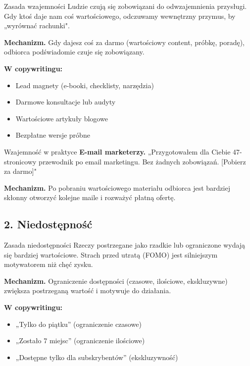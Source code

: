 \documentclass[
  12pt,
  a4paper,
  twoside,
  openright,
  12pt,
  DIV=12,
  BCOR=12mm]{scrbook}
\providecommand{\tightlist}{%
  \setlength{\itemsep}{0pt}\setlength{\parskip}{0pt}}\usepackage{longtable,booktabs,array}
\begin{document}
\begin{pojecie}{Zasada wzajemności}
Ludzie czują się zobowiązani do odwzajemnienia przysługi. Gdy ktoś daje nam coś wartościowego, odczuwamy wewnętrzny przymus, by „wyrównać rachunki".
\end{pojecie}

\textbf{Mechanizm.} Gdy dajesz coś za darmo (wartościowy content,
próbkę, poradę), odbiorca podświadomie czuje się zobowiązany.

\textbf{W copywritingu:}

\begin{itemize}
\tightlist
\item
  Lead magnety (e-booki, checklisty, narzędzia)
\item
  Darmowe konsultacje lub audyty
\item
  Wartościowe artykuły blogowe
\item
  Bezpłatne wersje próbne
\end{itemize}

\begin{przyklad}{Wzajemność w praktyce}
\textbf{E-mail marketerzy.} „Przygotowałem dla Ciebie 47-stronicowy przewodnik po email marketingu. Bez żadnych zobowiązań. [Pobierz za darmo]"

\textbf{Mechanizm.} Po pobraniu wartościowego materiału odbiorca jest bardziej skłonny otworzyć kolejne maile i rozważyć płatną ofertę.
\end{przyklad}

\subsection{2. Niedostępność}\label{niedostux119pnoux15bux107}

\begin{pojecie}{Zasada niedostępności}
Rzeczy postrzegane jako rzadkie lub ograniczone wydają się bardziej wartościowe. Strach przed utratą (FOMO) jest silniejszym motywatorem niż chęć zysku.
\end{pojecie}

\textbf{Mechanizm.} Ograniczenie dostępności (czasowe, ilościowe,
ekskluzywne) zwiększa postrzeganą wartość i motywuje do działania.

\textbf{W copywritingu:}

\begin{itemize}
\tightlist
\item
  „Tylko do piątku'' (ograniczenie czasowe)
\item
  „Zostało 7 miejsc'' (ograniczenie ilościowe)
\item
  „Dostępne tylko dla subskrybentów'' (ekskluzywność)
\end{itemize}
\end{document}
